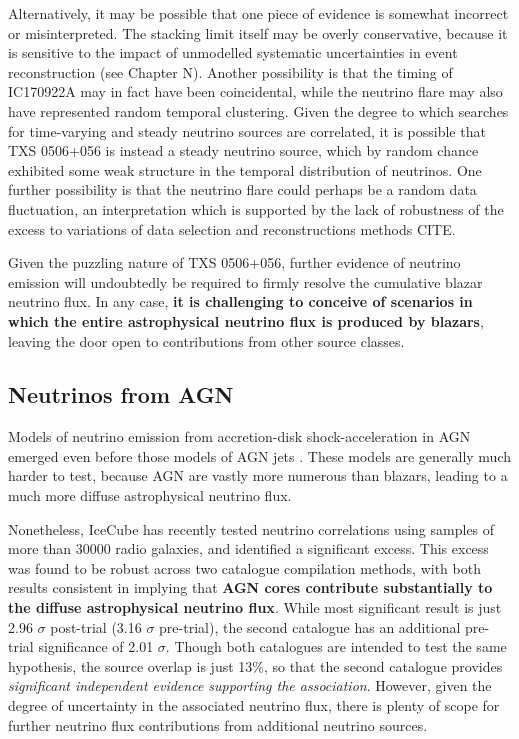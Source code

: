 Alternatively, it may be possible that one piece of evidence is somewhat incorrect or misinterpreted. The stacking limit itself may be overly conservative, because it is sensitive to the impact of unmodelled systematic uncertainties in event reconstruction (see Chapter N). Another possibility is that the timing of IC170922A may in fact have been coincidental, while the neutrino flare may also have represented random temporal clustering. Given the degree to which searches for time-varying and steady neutrino sources are correlated, it is possible that TXS 0506+056 is instead a steady neutrino source, which by random chance exhibited some weak structure in the temporal distribution of neutrinos. One further possibility is that the neutrino flare could perhaps be a random data fluctuation, an interpretation which is supported by the lack of robustness of the excess to variations of data selection and reconstructions methods CITE.

Given the puzzling nature of TXS 0506+056, further evidence of neutrino emission will undoubtedly be required to firmly resolve the cumulative blazar neutrino flux. In any case, \textbf{it is challenging to conceive of scenarios in which the entire astrophysical neutrino flux is produced by blazars}, leaving the door open to contributions from other source classes.

\subsection{Neutrinos from AGN}

Models of neutrino emission from accretion-disk shock-acceleration in AGN emerged even before those models of AGN jets . These models are generally much harder to test, because AGN are vastly more numerous than blazars, leading to a much more diffuse astrophysical neutrino flux. 

Nonetheless, IceCube has recently tested neutrino correlations using samples of more than 30000 radio galaxies, and identified a significant excess. This excess was found to be robust across two catalogue compilation methods, with both results consistent in implying that \textbf{AGN cores contribute substantially to the diffuse astrophysical neutrino flux}. While most significant result is just 2.96 $\sigma$ post-trial (3.16 $\sigma$ pre-trial), the second catalogue has an additional pre-trial significance of 2.01 $\sigma$. Though both catalogues are intended to test the same hypothesis, the source overlap is just 13\%, so that the second catalogue provides \emph{significant independent evidence supporting the association}. However, given the degree of uncertainty in the associated neutrino flux, there is plenty of scope for further neutrino flux contributions from additional neutrino sources.

